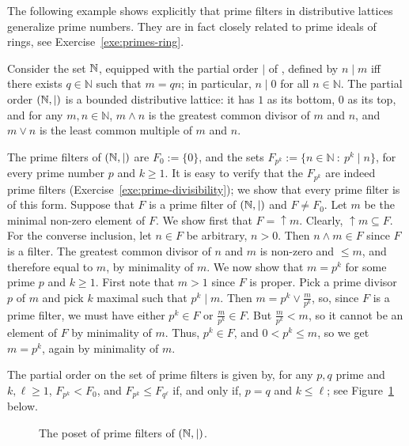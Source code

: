 The following example shows explicitly that prime filters in distributive lattices generalize prime numbers. They are in fact closely related to prime ideals of rings, see Exercise~\ref{exe:primes-ring}.
\begin{example}\label{exa:prime-divisibility}
Consider the set $\mathbb{N}$, equipped with the partial order $|$ of , defined by $n \mid m$ iff there exists $q \in \mathbb{N}$ such that $m = qn$; in particular, $n \mid 0$ for all $n \in \mathbb{N}$. The partial order $(\mathbb{N}, |)$ is a bounded distributive lattice: it has $1$ as its bottom, $0$ as its top, and for any $m, n \in \mathbb{N}$, $m \wedge n$ is the greatest common divisor of $m$ and $n$, and $m \vee n$ is the least common multiple of $m$ and $n$.

The prime filters of $(\mathbb{N}, |)$ are $F_0 := \{0\}$, and the sets $F_{p^k} := \{n \in \mathbb{N} \ : \ p^k \mid n\}$, for every prime number $p$ and $k \geq 1$. It is easy to verify that the $F_{p^k}$ are indeed prime filters (Exercise~\ref{exe:prime-divisibility}); we show that every prime filter is of this form. Suppose that $F$ is a prime filter of $(\mathbb{N}, |)$ and $F \neq F_0$. Let $m$ be the minimal non-zero element of $F$. We show first that $F = {\uparrow} m$. Clearly, ${\uparrow} m \subseteq F$. For the converse inclusion, let $n \in F$ be arbitrary, $n > 0$. Then $n \wedge m \in F$ since $F$ is a filter. The greatest common divisor of $n$ and $m$ is non-zero and $\leq m$, and therefore equal to $m$, by minimality of $m$. We now show that $m = p^k$ for some prime $p$ and $k \geq 1$. First note that $m > 1$ since $F$ is proper. Pick a prime divisor $p$ of $m$ and pick $k$ maximal such that $p^k \mid m$. Then $m = p^k \vee \frac{m}{p^k}$, so, since $F$ is a prime filter, we must have either $p^k \in F$ or $\frac{m}{p^k} \in F$. But $\frac{m}{p^k} < m$, so it cannot be an element of $F$ by minimality of $m$. Thus, $p^k \in F$, and $0 < p^k \leq m$, so we get $m = p^k$, again by minimality of $m$. 

The partial order on the set of prime filters is given by, for any $p, q$ prime and $k, \ell \geq 1$, $F_{p^k} < F_0$, and $F_{p^k} \leq F_{q^\ell}$ if, and only if, $p = q$ and $k \leq \ell$; see Figure~\ref{fig:prime-naturalnumbers} below.
\begin{figure}[htp]
\begin{center}
\end{center}
\caption{The poset of prime filters of $(\mathbb{N}, |)$.}
\label{fig:prime-naturalnumbers}
\end{figure}
\end{example}


